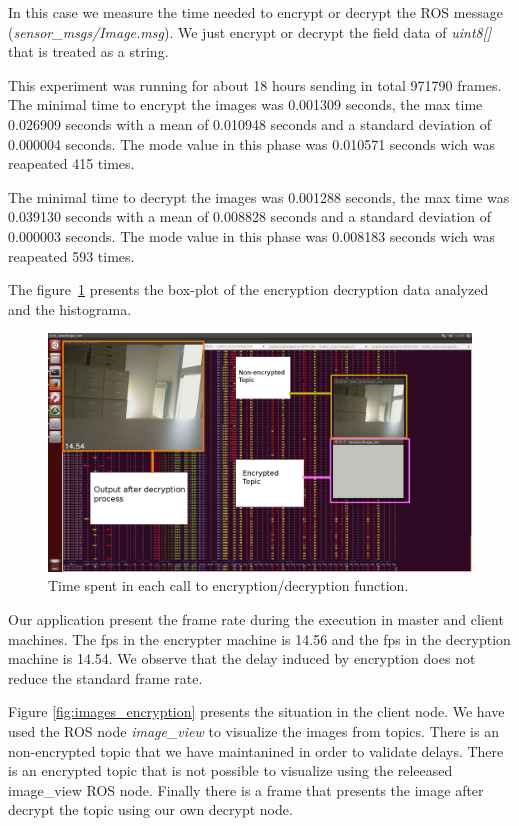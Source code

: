 \documentclass[journal,twoside]{JoPhA}
\begin{document}
In this case we measure the time needed to encrypt or decrypt the ROS message ({\em sensor\_msgs/Image.msg}). We just encrypt or decrypt the field data of {\em uint8[]} that is treated as a string.

This experiment was running for about 18 hours sending in total 971790 frames. The minimal time to encrypt the images was 0.001309 seconds, the max time  0.026909 seconds with a 
mean of  0.010948 seconds and a standard deviation of 0.000004 seconds. The mode value in this phase was 0.010571 seconds wich was reapeated 415 times. 

The minimal time to decrypt the images was 0.001288 seconds, the max time was 0.039130 seconds with a 
mean of  0.008828 seconds and a standard deviation of 0.000003 seconds. The mode value in this phase was 0.008183 seconds wich was reapeated 593 times. 


The figure~\ref{fig:graphicalRepresentation} presents the box-plot of the encryption decryption data analyzed and the histograma. 

\begin{figure}[ht]
    \centering
    \includegraphics[width=.5\textwidth]{Screenshot.png}
    \caption{Time spent in each call to encryption/decryption function.}
  \label{fig:graphicalRepresentation}
\end{figure}


Our application present the frame rate during the execution in master and client machines. The fps in the encrypter machine is 14.56 and the fps in the decryption machine is 14.54.
We observe that the delay induced by encryption does not reduce the standard frame rate. 




Figure \ref{fig:images_encryption} presents the situation in the client node. We have used the ROS node {\em image\_view} to visualize the images from topics.  There is an non-encrypted topic that we have maintanined in order to validate delays. There is an encrypted topic that is not possible to visualize using the releeased image\_view ROS node. Finally there is a frame that presents the image after decrypt the topic using our own decrypt node. 
\end{document}
